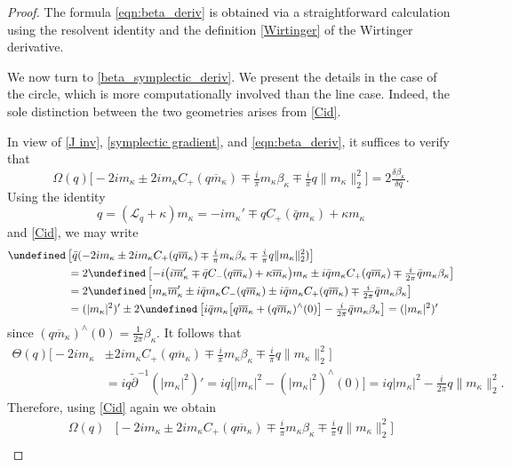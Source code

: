 \documentclass{amsart}
\numberwithin{equation}{section}
\theoremstyle{definition}
\newcommand{\dl}{\delta}
\newcommand{\Om}{\Omega}
\newcommand{\ka}{\kappa}
\newcommand{\Lc}{\mathcal{L}}
\newcommand{\dd}{\partial}
\let\Re=\undefined\DeclareMathOperator{\Re}{Re}
\begin{document}
\begin{proof}
The formula \eqref{eqn:beta_deriv} is obtained via a straightforward calculation using the resolvent identity and the definition \eqref{Wirtinger} of the Wirtinger derivative.

We now turn to \eqref{beta_symplectic_deriv}. We present the details in the case of the circle, which is more computationally involved than the line case.  Indeed, the sole distinction between the two geometries arises from \eqref{Cid}.

In view of \eqref{J inv}, \eqref{symplectic gradient}, and \eqref{eqn:beta_deriv}, it suffices to verify that
$$
\Om(q)\bigl[-2im_\ka\pm 2im_\ka C_+(q\overline m_\ka)\mp\tfrac{i}{\pi}m_\ka\beta_\ka\mp\tfrac{i}{\pi}q\|m_\ka\|^2_2\bigr]=2 \tfrac{\dl \beta_\ka}{\dl \bar{q}}.
$$
Using the identity
\begin{equation}\label{eqn:q_eqn}
q=(\Lc_q+\ka)m_\ka=-im_\ka'\mp q C_+(\bar{q}m_\ka)+\ka m_\ka
\end{equation}
and \eqref{Cid}, we may write
\begin{align*}
\Re\, &\bigl[\bar{q}(-2im_\ka\pm 2im_\ka C_+(q\overline m_\ka)\mp\tfrac{i}{\pi}m_\ka\beta_\ka\mp\tfrac{i}{\pi}q\|m_\ka\|_2^2)\bigr]\\
&=2\Re\,\bigl[-i\bigl(i\overline m_\ka'\mp\bar{q}C_-(q\overline m_\ka)+\ka\overline m_\ka\bigr)m_\ka\pm i\bar{q}m_\ka C_+(q\overline m_\ka)\mp \tfrac{i}{2\pi}\bar{q}m_\ka\beta_\ka\bigr]\\
&=2\Re\, \bigl[m_\ka\overline m_\ka'\pm i\bar{q}m_\ka C_-(q\overline m_\ka)\pm i\bar{q}m_\ka C_+(q\overline m_\ka)\mp \tfrac{i}{2\pi}\bar{q}m_\ka\beta_\ka\bigr]\\
&=(|m_\ka|^2)' \pm 2\Re\, \bigl[i\bar{q}m_\ka\bigl[q\overline m_\ka+(q\overline m_\ka)^{\wedge}(0)\bigr]-\tfrac{i}{2\pi}\bar{q}m_\ka\beta_\ka\bigr]=(|m_\ka|^2)'
\end{align*}
since $(q\overline m_\ka)^{\wedge}(0)=\frac1{2\pi}\beta_\ka$. It follows that
\begin{align*}
\Theta(q)\bigl[-2im_\ka&\pm 2im_\ka C_+(q\overline m_\ka)\mp\tfrac{i}{\pi} m_\ka\beta_\ka\mp\tfrac{i}{\pi}q\|m_\ka\|_2^2\bigr]\\
&=iq\tilde{\dd}^{-1}(|m_\ka|^2)'=iq\bigl[|m_\ka|^2-(|m_\ka|^2)^{\wedge}(0)\bigr]=iq|m_\ka|^2-\tfrac{i}{2\pi}q\|m_\ka\|^2_2.
\end{align*}
Therefore, using \eqref{Cid} again we obtain
\begin{align*}
\Om (q)&\bigl[-2im_\ka\pm 2im_\ka C_+(q\overline m_\ka)\mp\tfrac{i}{\pi}m_\ka\beta_\ka\mp\tfrac{i}{\pi}q\|m_\ka\|_2^2\bigr]\\

\end{align*}
\end{proof}
\end{document}
